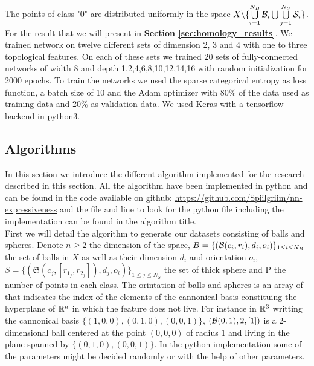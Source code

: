 \documentclass[12pt, a4paper]{article}
\begin{document}
The points of class "0" are distributed uniformly in the space $X \backslash \{\bigcup\limits_{i=1}^{N_B} \mathcal{B}_i \bigcup \bigcup\limits_{j=1}^{N_S} \mathcal{S}_i \}$.\\

For the result that we will present in \textbf{Section \ref{sec:homology_results}}. We trained network on twelve different sets of dimension 2, 3 and 4 with one to three topological features. On each of these sets we trained 20 sets of fully-connected networks of width 8 and depth 1,2,4,6,8,10,12,14,16 with random initialization for 2000 epochs. To train the networks we used the sparse categorical entropy as loss function, a batch size of 10 and the Adam optimizer with 80\% of the data used as training data and 20\% as validation data. We used Keras \cite{chollet2015keras} with a tensorflow backend in python3. 


\subsection{Algorithms}

In this section we introduce the different algorithm implemented for the research described in this section. All the algorithm have been implemented in python and can be found in the code available on github: \url{https://github.com/Spiilgriim/nn-expressiveness} and the file and line to look for the python file including the implementation can be found in the algorithm title.\\

First we will detail the algorithm to generate our datasets consisting of balls and spheres. Denote $n \ge 2$ the dimension of the space, $B = \{(\mathcal{B}(c_i, r_i), d_i, o_i)\}_{1 \le i \le N_B}$ the set of balls in $X$ as well as their dimension $d_i$ and orientation $o_i$, $S = \{(\mathfrak{S}(c_j, [r_{1_j}, r_{2_j}]), d_j, o_i)\}_{1 \le j \le N_S}$ the set of thick sphere and P the number of points in each class. The orintation of balls and spheres is an array of that indicates the index of the elements of the cannonical basis constituing the hyperplane of $\mathbb{R}^n$ in which the feature does not live. For instance in $\mathbb{R}^3$ writting the cannonical basis $\{(1,0,0), (0,1,0), (0,0,1)\}$, $(\mathcal{B}(0,1),2,[1])$ is a 2-dimensional ball centered at the point $(0,0,0)$ of radius $1$ and living in the plane spanned by $\{(0,1,0),(0,0,1)\}$. In the python implementation some of the parameters might be decided randomly or with the help of other parameters.\\
\end{document}
